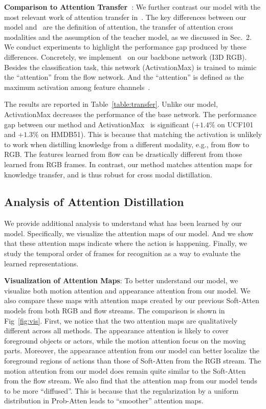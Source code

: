 \documentclass[10pt,twocolumn,letterpaper]{article}
\begin{document}
\noindent \textbf{Comparison to Attention Transfer~\cite{Zagoruyko2017AT}}: We further contrast our model with the most relevant work of attention transfer in~\cite{Zagoruyko2017AT}. The key differences between our model and~\cite{Zagoruyko2017AT} are the definition of attention, the transfer of attention cross modalities and the assumption of the teacher model, as we discussed in Sec.\ 2. We conduct experiments to highlight the performance gap produced by these differences. Concretely, we implement~\cite{Zagoruyko2017AT} on our backbone network (I3D RGB). Besides the classification task, this network (ActivationMax) is trained to mimic the ``attention'' from the flow network. And the ``attention'' is defined as the maximum activation among feature channels~\cite{Zagoruyko2017AT}. 

The results are reported in Table~\ref{table:transfer}. Unlike our model, ActivationMax decreases the performance of the base network. The performance gap between our method and ActivationMax~\cite{Zagoruyko2017AT} is significant (+$1.4\%$ on UCF101 and +$1.3\%$ on HMDB51). This is because that matching the activation is unlikely to work when distilling knowledge from a different modality, e.g., from flow to RGB. The features learned from flow can be drastically different from those learned from RGB frames. In contrast, our method matches attention maps for knowledge transfer, and is thus robust for cross modal distillation. 

\subsection{Analysis of Attention Distillation}
We provide additional analysis to understand what has been learned by our model. Specifically, we visualize the attention maps of our model. And we show that these attention maps indicate where the action is happening. Finally, we study the temporal order of frames for recognition as a way to evaluate the learned representations. 

\noindent \textbf{Visualization of Attention Maps}: 
To better understand our model, we visualize both motion attention and appearance attention from our model. We also compare these maps with attention maps created by our previous Soft-Atten models from both RGB and flow streams. The comparison is shown in Fig~\ref{fig:vis}. First, we notice that the two attention maps are qualitatively different across all methods. The appearance attention is likely to cover foreground objects or actors, while the motion attention focus on the moving parts. Moreover, the appearance attention from our model can better localize the foreground regions of actions than those of Soft-Atten from the RGB stream. The motion attention from our model does remain quite similar to the Soft-Atten from the flow stream. We also find that the attention map from our model tends to be more ``diffused''. This is because that the regularization by a uniform distribution in Prob-Atten leads to ``smoother'' attention maps.
\end{document}
